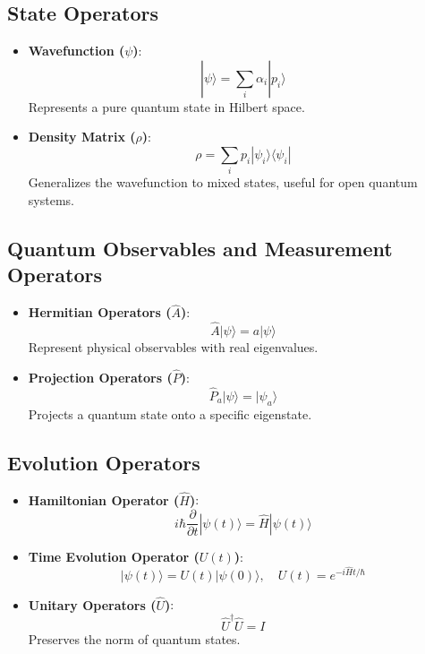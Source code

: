 \documentclass{article}
\theoremstyle{plain}
\begin{document}
\begin{itemize}
\subsection{State Operators}
\begin{itemize}
    \item \textbf{Wavefunction (\(\psi\))}:
    \[
    |\psi\rangle = \sum_i \alpha_i |p_i\rangle
    \]
    Represents a pure quantum state in Hilbert space.
    
    \item \textbf{Density Matrix (\(\rho\))}:
    \[
    \rho = \sum_i p_i |\psi_i\rangle \langle \psi_i|
    \]
    Generalizes the wavefunction to mixed states, useful for open quantum systems.
\end{itemize}

\subsection{Quantum Observables and Measurement Operators}
\begin{itemize}
    \item \textbf{Hermitian Operators (\(\hat{A}\))}:
    \[
    \hat{A} |\psi\rangle = a |\psi\rangle
    \]
    Represent physical observables with real eigenvalues.

    \item \textbf{Projection Operators (\(\hat{P}\))}:
    \[
    \hat{P}_a |\psi\rangle = |\psi_a\rangle
    \]
    Projects a quantum state onto a specific eigenstate.
\end{itemize}

\subsection{Evolution Operators}
\begin{itemize}
    \item \textbf{Hamiltonian Operator (\(\hat{H}\))}:
    \[
    i\hbar \frac{\partial}{\partial t} |\psi(t)\rangle = \hat{H} |\psi(t)\rangle
    \]

    \item \textbf{Time Evolution Operator (\(U(t)\))}:
    \[
    |\psi(t)\rangle = U(t) |\psi(0)\rangle, \quad U(t) = e^{-i \hat{H} t / \hbar}
    \]

    \item \textbf{Unitary Operators (\(\hat{U}\))}:
    \[
    \hat{U}^\dagger \hat{U} = I
    \]
    Preserves the norm of quantum states.
\end{itemize}


\end{itemize}
\end{document}
